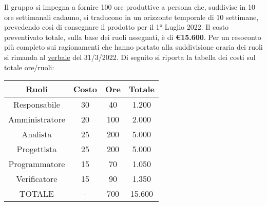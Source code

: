 Il gruppo \textit{\teamname} si impegna a fornire 100 ore produttive a persona che, suddivise in 10 ore settimanali cadauno, si traducono in un orizzonte temporale di 10 settimane, prevedendo così di consegnare il prodotto per il 1° Luglio 2022. \newline
Il costo preventivato totale, sulla base dei ruoli assegnati, è di \textbf{\euro{15.600}}. \newline
Per un resoconto più completo sui ragionamenti che hanno portato alla suddivisione oraria dei ruoli si rimanda al \href{https://github.com/Bug-s-Bunny-Team/docs/blob/master/docs/Verbali/Interni/vi_20220331.pdf}{verbale} del 31/3/2022. \newline
Di seguito si riporta la tabella dei costi sul totale ore/ruoli:

\begin{table}[h]
	\begin{center}
		\setlength{\extrarowheight}{.75ex}
		\begin{tabular}{ | c | c | c | c | }
			\hline 	
			\textbf{Ruoli} & \textbf{Costo} & \textbf{Ore} & \textbf{Totale}\\
			\hline 			
			
			Responsabile{} & 30{} & 40{} & 1.200{} \\
			Amministratore{} & 20{} & 100{} & 2.000{} \\
			Analista{} & 25{} & 200{} & 5.000{} \\
			Progettista{} & 25{} & 200{} & 5.000{}  \\
			Programmatore{} & 15{} & 70{} & 1.050{}  \\
			Verificatore{} & 15{} & 90{} & 1.350{}  \\
			TOTALE{} & -{} & 700{} & 15.600{}  \\	
			
			\hline 
		\end{tabular}
	\end{center}
\end{table}
